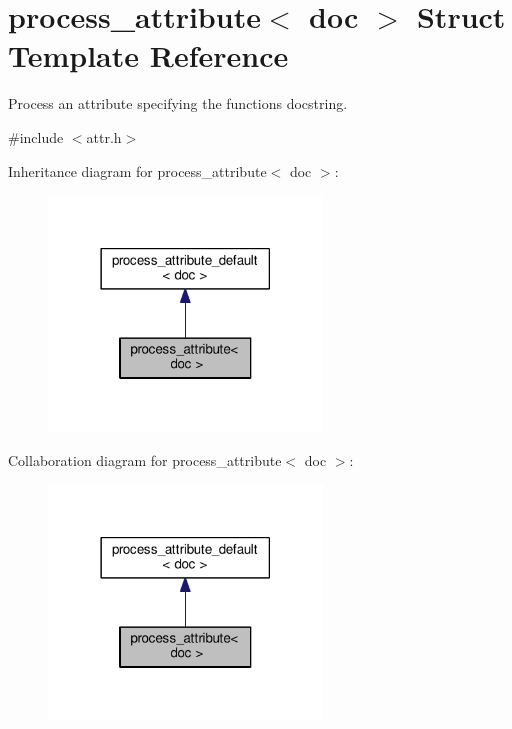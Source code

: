 \hypertarget{structprocess__attribute_3_01doc_01_4}{}\section{process\+\_\+attribute$<$ doc $>$ Struct Template Reference}
\label{structprocess__attribute_3_01doc_01_4}


Process an attribute specifying the function\textquotesingle{}s docstring.  




{\ttfamily \#include $<$attr.\+h$>$}



Inheritance diagram for process\+\_\+attribute$<$ doc $>$\+:
\nopagebreak
\begin{figure}[H]
\begin{center}
\leavevmode
\includegraphics[width=206pt]{structprocess__attribute_3_01doc_01_4__inherit__graph}
\end{center}
\end{figure}


Collaboration diagram for process\+\_\+attribute$<$ doc $>$\+:
\nopagebreak
\begin{figure}[H]
\begin{center}
\leavevmode
\includegraphics[width=206pt]{structprocess__attribute_3_01doc_01_4__coll__graph}
\end{center}
\end{figure}
